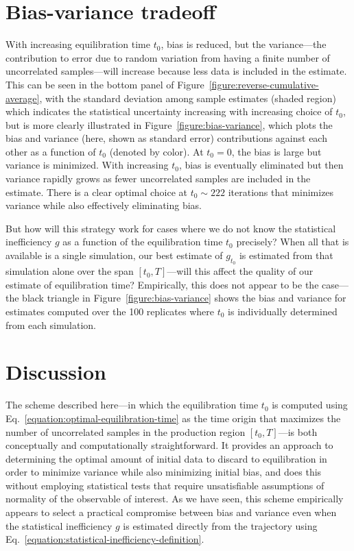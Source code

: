 \documentclass[aps,pre,twocolumn,nofootinbib,superscriptaddress,linenumbers,11point]{revtex4-1}
\begin{document}
\section*{Bias-variance tradeoff}

With increasing equilibration time $t_0$, bias is reduced, but the variance---the contribution to error due to random variation from having a finite number of uncorrelated samples---will increase because less data is included in the estimate.
This can be seen in the bottom panel of Figure~\ref{figure:reverse-cumulative-average}, with the standard deviation among sample estimates (shaded region) which indicates the statistical uncertainty increasing with increasing choice of $t_0$, but is more clearly illustrated in Figure~\ref{figure:bias-variance}, which plots the bias and variance (here, shown as standard error) contributions against each other as a function of $t_0$ (denoted by color).
At $t_0 = 0$, the bias is large but variance is minimized.
With increasing $t_0$, bias is eventually eliminated but then variance rapidly grows as fewer uncorrelated samples are included in the estimate.
There is a clear optimal choice at $t_0 \sim 222$ iterations that minimizes variance while also effectively eliminating bias.

But how will this strategy work for cases where we do not know the statistical inefficiency $g$ as a function of the equilibration time $t_0$ precisely?
When all that is available is a single simulation, our best estimate of $g_{t_0}$ is estimated from that simulation alone over the span $[t_0,T]$---will this affect the quality of our estimate of equilibration time?
Empirically, this does not appear to be the case---the black triangle in Figure~\ref{figure:bias-variance} shows the bias and variance for estimates computed over the 100 replicates where $t_0$ is individually determined from each simulation.


\section*{Discussion}
\label{section:discussion}

The scheme described here---in which the equilibration time $t_0$ is computed using Eq.~\ref{equation:optimal-equilibration-time} as the time origin that maximizes the number of uncorrelated samples in the production region $[t_0,T]$---is both conceptually and computationally straightforward.
It provides an approach to determining the optimal amount of initial data to discard to equilibration in order to minimize variance while also minimizing initial bias, and does this without employing statistical tests that require unsatisfiable assumptions of normality of the observable of interest.
As we have seen, this scheme empirically appears to select a practical compromise between bias and variance even when the statistical inefficiency $g$ is estimated directly from the trajectory using Eq.~\ref{equation:statistical-inefficiency-definition}.
\end{document}
